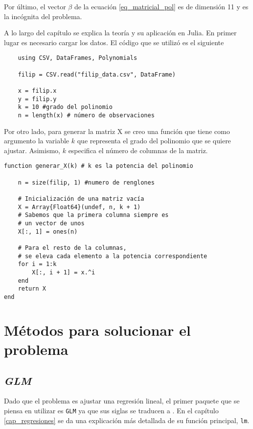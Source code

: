 Por último, el vector $\beta$ de la ecuación \ref{eq_matricial_pol} es de dimensión 11 y es la incógnita del problema. 

A lo largo del capítulo se explica la teoría y su aplicación en \textsf{Julia}. En primer lugar es necesario cargar los datos. El código que se utilizó es el siguiente


\begin{verbatim}
    using CSV, DataFrames, Polynomials
    
    filip = CSV.read("filip_data.csv", DataFrame)

    x = filip.x
    y = filip.y
    k = 10 #grado del polinomio
    n = length(x) # número de observaciones
\end{verbatim}

Por otro lado, para generar la matriz X se creo una función que tiene como argumento la variable $k$ que representa el grado del polinomio que se quiere ajustar. Asimismo, $k$ especifica el número de columnas de la matriz. 

\begin{verbatim}
function generar_X(k) # k es la potencia del polinomio

    n = size(filip, 1) #numero de renglones
    
    # Inicialización de una matriz vacía
    X = Array{Float64}(undef, n, k + 1)
    # Sabemos que la primera columna siempre es 
    # un vector de unos
    X[:, 1] = ones(n)
    
    # Para el resto de la columnas,
    # se eleva cada elemento a la potencia correspondiente
    for i = 1:k
        X[:, i + 1] = x.^i
    end
    return X
end
\end{verbatim}



\section{Métodos para solucionar el problema}

\subsection{\textit{GLM}}

Dado que el problema es ajustar una regresión lineal, el primer paquete que se piensa en utilizar es \texttt{GLM} ya que sus siglas se traducen a . En el capítulo \ref{cap_regresiones} se da una explicación más detallada de su función principal, \texttt{lm}. 

